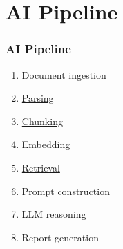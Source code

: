 % 

\section{AI Pipeline}
\begin{frame}\frametitle{AI Pipeline}
	\begin{enumerate}
		\item Document ingestion
		\item \href{https://en.wikipedia.org/wiki/Parsing}{Parsing}
		\item \href{https://www.pinecone.io/learn/chunking-strategies/}{Chunking}
		\item \href{https://aws.amazon.com/what-is/embeddings-in-machine-learning/}{Embedding}
		\item \href{https://aws.amazon.com/what-is/retrieval-augmented-generation/}{Retrieval}
		\item \href{https://mitsloanedtech.mit.edu/ai/basics/effective-prompts/}{Prompt} \href{https://developers.openai.com/api/docs/guides/prompt-engineering}{construction}
		\item \href{https://developer.nvidia.com/blog/an-easy-introduction-to-llm-reasoning-ai-agents-and-test-time-scaling/}{LLM reasoning}
		\item Report generation
	\end{enumerate}
\end{frame}

\endinput  %

\subsection{A}
\begin{frame}\frametitle{Title}
\center
	Slide content
\end{frame}

\subsection{B}
\begin{frame}\frametitle{Title}
\center
	Slide content
\end{frame}

\endinput  %
